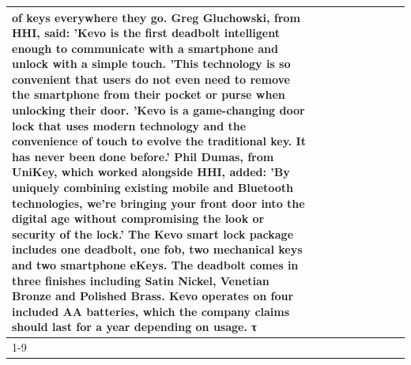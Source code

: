 \begin{table}[H]
\begin{tabular}{lllrlllll}
of keys everywhere they go. Greg Gluchowski, from HHI, said: 'Kevo is the first deadbolt intelligent enough to communicate with a smartphone and unlock with a simple touch. 'This technology is so convenient that users do not even need to remove the smartphone from their pocket or purse when unlocking their door. 'Kevo is a game-changing door lock that uses modern technology and the convenience of touch to evolve the traditional key. It has never been done before.' Phil Dumas, from UniKey, which worked alongside HHI, added: 'By uniquely combining existing mobile and Bluetooth technologies, we’re bringing your front door into the digital age without compromising the look or security of the lock.' The Kevo smart lock package includes one deadbolt, one fob, two mechanical keys and two smartphone eKeys. The deadbolt comes in three finishes including Satin Nickel, Venetian Bronze and Polished Brass. Kevo operates on four included AA batteries, which the company claims should last for a year depending on usage. τ \\
\cline{1-9}

\end{tabular}
\end{table}
